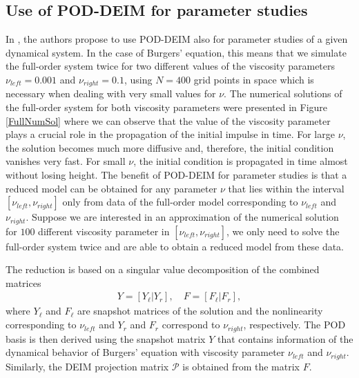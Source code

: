 \subsection{Use of POD-DEIM for parameter studies}
In \cite{CS10}, the authors propose to use POD-DEIM also for parameter studies of a given dynamical system. In the case of Burgers' equation, this means that we simulate the full-order system twice for two different values of the viscosity parameters $\nu_{left} = 0.001$ and $\nu_{right} = 0.1$, using $N=400$ grid points in space which is necessary when dealing with very small values for $\nu$. The numerical solutions of the full-order system for both viscosity parameters were presented in Figure \ref{FullNumSol} where we can observe that the value of the viscosity parameter plays a crucial role in the propagation of the initial impulse in time. For large $\nu$, the solution becomes much more diffusive and, therefore, the initial condition vanishes very fast. For small $\nu$, the initial condition is propagated in time almost without losing height.
The benefit of POD-DEIM for parameter studies is that a reduced model can be obtained for any parameter $\nu$ that lies within the interval $[\nu_{left},\nu_{right}]$ only from data of the full-order model corresponding to $\nu_{left}$ and $\nu_{right}$. Suppose we are interested in an approximation of the numerical solution for $100$ different viscosity parameter in $[\nu_{left},\nu_{right}]$, we only need to solve the full-order system twice and are able to obtain a reduced model from these data.

The reduction is based on a singular value decomposition of the combined matrices
\begin{align*}
Y = [Y_{\ell} | Y_{r}], \quad F = [F_{\ell} | F_{r}],
\end{align*}
where $Y_{\ell}$ and $F_{\ell}$ are snapshot matrices of the solution and the nonlinearity corresponding to $\nu_{left}$ and $Y_{r}$ and $F_r$ correspond to $\nu_{right}$, respectively. The POD basis is then derived using the snapshot matrix $Y$ that contains information of the dynamical behavior of Burgers' equation with viscosity parameter $\nu_{left}$ and $\nu_{right}$. Similarly, the DEIM projection matrix $\mathcal{P}$ is obtained from the matrix $F$.

